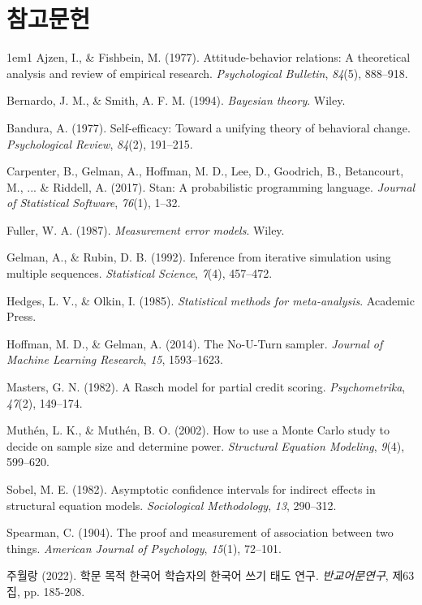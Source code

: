 \documentclass[a4paper,10pt]{oblivoir}
\begin{document}
\section*{참고문헌}
\begin{hangparas}{1em}{1}
Ajzen, I., \& Fishbein, M. (1977). Attitude-behavior relations: A theoretical analysis and review of empirical research. \textit{Psychological Bulletin}, \textit{84}(5), 888–918.

Bernardo, J. M., \& Smith, A. F. M. (1994). \textit{Bayesian theory}. Wiley.

Bandura, A. (1977). Self-efficacy: Toward a unifying theory of behavioral change. \textit{Psychological Review}, \textit{84}(2), 191–215.

Carpenter, B., Gelman, A., Hoffman, M. D., Lee, D., Goodrich, B., Betancourt, M., ... \& Riddell, A. (2017). Stan: A probabilistic programming language. \textit{Journal of Statistical Software}, \textit{76}(1), 1–32.

Fuller, W. A. (1987). \textit{Measurement error models}. Wiley.

Gelman, A., \& Rubin, D. B. (1992). Inference from iterative simulation using multiple sequences. \textit{Statistical Science}, \textit{7}(4), 457–472.

Hedges, L. V., \& Olkin, I. (1985). \textit{Statistical methods for meta-analysis}. Academic Press.

Hoffman, M. D., \& Gelman, A. (2014). The No-U-Turn sampler. \textit{Journal of Machine Learning Research}, \textit{15}, 1593–1623.

Masters, G. N. (1982). A Rasch model for partial credit scoring. \textit{Psychometrika}, \textit{47}(2), 149–174.

Muthén, L. K., \& Muthén, B. O. (2002). How to use a Monte Carlo study to decide on sample size and determine power. \textit{Structural Equation Modeling}, \textit{9}(4), 599–620.

Sobel, M. E. (1982). Asymptotic confidence intervals for indirect effects in structural equation models. \textit{Sociological Methodology}, \textit{13}, 290–312.

Spearman, C. (1904). The proof and measurement of association between two things. \textit{American Journal of Psychology}, \textit{15}(1), 72–101.

주월랑 (2022). 학문 목적 한국어 학습자의 한국어 쓰기 태도 연구. \textit{반교어문연구}, 제63집, pp. 185-208.
\end{hangparas}
\end{document}

